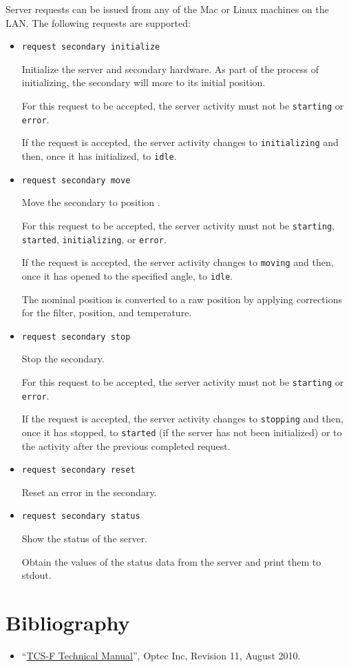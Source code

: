 Server requests can be issued from any of the Mac or Linux machines on the LAN. The following requests are supported:

\begin{itemize}
\item
\verb|request secondary initialize|

Initialize the server and secondary hardware. As part of the process of initializing, the secondary will more to its initial position.

For this request to be accepted, the server activity must not be \verb|starting| or \verb|error|.

If the request is accepted, the server activity changes to \verb|initializing| and then, once it has initialized, to \verb|idle|.

\item
\verb|request secondary move| 

Move the secondary to position .

For this request to be accepted, the server activity must not be \verb|starting|, \verb|started|, \verb|initializing|, or \verb|error|.

If the request is accepted, the server activity changes to \verb|moving| and then, once it has opened to the specified angle, to \verb|idle|.

The nominal position  is converted to a raw position by applying corrections for the filter, position, and temperature.

\item
\verb|request secondary stop|

Stop the secondary.

For this request to be accepted, the server activity must not be \verb|starting| or \verb|error|.

If the request is accepted, the server activity changes to \verb|stopping| and then, once it has stopped, to \verb|started| (if the server has not been initialized) or to the activity after the previous completed request.

\item
\verb|request secondary reset|

Reset an error in the secondary.


\item
\verb|request secondary status|

Show the status of the server.

Obtain the values of the status data from the server and print them to stdout.
\end{itemize}

\section{Bibliography}

\begin{flushleft}
\begin{itemize}
\item “\href{bibliography/secondary-coatli/tcs-f-manual.pdf}{TCS-F Technical Manual}”, Optec Inc, Revision 11, August 2010.
\end{itemize}
\end{flushleft}